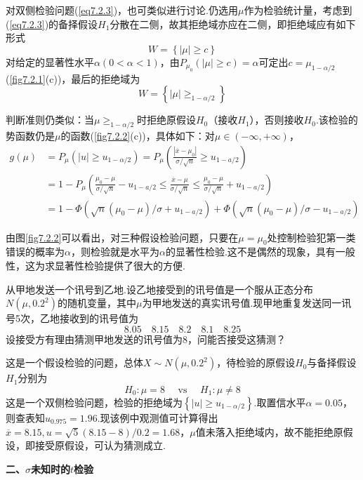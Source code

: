 对双侧检验问题(\ref{eq7.2.3})，也可类似进行讨论.仍选用$\mu$作为检验统计量，考虑到(\ref{eq7.2.3})的备择假设$H_{1}$分散在二侧，故其拒绝域亦应在二侧，即拒绝域应有如下形式
\[W=\left\{\left|\mu\right|\geq c\right\}\]
对给定的显著性水平$\alpha(0<\alpha<1)$，由$P_{\mu_0}\left(\left|\mu\right|\geq c\right)=\alpha $可定出$c=\mu_{1-\alpha/2}$(\ref{fig7.2.1}(c))，最后的拒绝域为
\begin{equation}\label{eq7.2.8}
W=\left\{\left|\mu\right|\geq_{1-\alpha/2}\right\}
\end{equation}

判断准则仍类似：当$\mu\geq_{1-\alpha/2}$时拒绝原假设$H_{0}$（接收$H_{1}$），否则接收$H_{0}$.该检验的势函数仍是$\mu $的函数(\ref{fig7.2.2}(c))，具体如下：对$\mu \in (-\infty,+\infty)$，
\begin{align*}
	g ( \mu ) &= P _ { \mu } \left( | u | \geq u _ { 1 - \alpha / 2 } \right) = P _ { \mu } \left( \frac { \left| \overline { x } - \mu _ { 0 } \right| } { \sigma / \sqrt { n } } \geq u _ { 1 - a / 2 } \right)\\
	&=1-P_{\mu}\left(\frac{\mu_0-\mu}{\sigma/\sqrt{n}}-u_{1-a/2}\le\frac{\overline{x}-\mu}{\sigma/\sqrt{n}}\le\frac{\mu_0-\mu}{\sigma/\sqrt{n}}+u_{1-a/2}\right)\\
	&= 1 - \Phi \left( \sqrt { n } \left( \mu _ { 0 } - \mu \right) / \sigma + u _ { 1 - a / 2 } \right) + \Phi \left( \sqrt { n } \left( \mu _ { 0 } - \mu \right) / \sigma - u _ { 1 - a / 2 } \right)
\end{align*}

由图\ref{fig7.2.2}可以看出，对三种假设检验问题，只要在$\mu=\mu_{ 0 }$处控制检验犯第一类错误的概率为$\alpha$，则检验就是水平为$\alpha$的显著性检验.这不是偶然的现象，具有一般性，这为求显著性检验提供了很大的方便.
\begin{example}\label{exam7.2.1}
从甲地发送一个讯号到乙地.设乙地接受到的讯号值是一个服从正态分布$N(\mu ,0.2^{2})$的随机变量，其中$\mu $为甲地发送的真实讯号值.现甲地重复发送同一讯号5次，乙地接收到的讯号值为
\[8.05 \quad 8.15 \quad 8.2 \quad 8.1 \quad 8.25\]
设接受方有理由猜测甲地发送的讯号值为8，问能否接受这猜测？
\end{example}
\begin{solution}
	这是一个假设检验的问题，总体$X \sim N \left( \mu , 0.2 ^ { 2 } \right)$，待检验的原假设$H_{0}$与备择假设$H_{1}$分别为
	\[H _ { 0 } : \mu = 8 \quad \text { vs } \quad H _ { 1 } : \mu \neq 8\]
	这是一个双侧检验问题，检验的拒绝域为$\left\{ | u | \geq u _ { 1 - \alpha / 2} \right\}$.取置信水平$\alpha=0.05$，则查表知$u_{0.975}=1.96$.现该例中观测值可计算得出$\overline{x}=8.15,u=\sqrt{5}\left(8.15-8\right)/0.2=1.68$，$\mu $值未落入拒绝域内，故不能拒绝原假设，即接受原假设，可认为猜测成立.
	
\end{solution}
\textbf{二、$\sigma$未知时的$t$检验}

